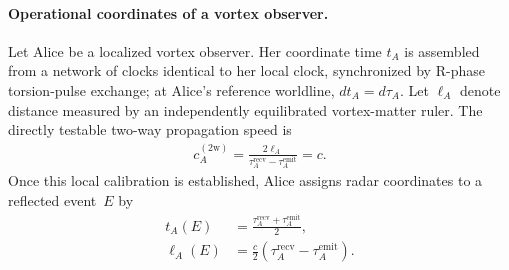 \documentclass[11pt]{article}
\theoremstyle{definition}
\theoremstyle{plain}
\theoremstyle{remark}
\begin{document}
        \paragraph{Operational coordinates of a vortex observer.}
        Let Alice be a localized vortex observer. Her coordinate time \(t_A\) is assembled from a network of clocks identical to her local clock, synchronized by R-phase torsion-pulse exchange; at Alice's reference worldline, \(dt_A=d\tau_A\). Let \(\ell_A\) denote distance measured by an independently equilibrated vortex-matter ruler. The directly testable two-way propagation speed is
        \begin{align}
            c_A^{(2\mathrm w)}
            =
            \frac{2\ell_A}
            {\tau_A^{\mathrm{recv}}-\tau_A^{\mathrm{emit}}}
            =c.
            \label{eq:canonical_time_vortex_radar_speed}
        \end{align}
        Once this local calibration is established, Alice assigns radar coordinates to a reflected event~\(E\) by
        \begin{align}
            t_A(E)
            &=
            \frac{\tau_A^{\mathrm{recv}}+\tau_A^{\mathrm{emit}}}{2},\\
            \ell_A(E)
            &=
            \frac{c}{2}
            \left(
                \tau_A^{\mathrm{recv}}-\tau_A^{\mathrm{emit}}
            \right).
            \label{eq:canonical_time_vortex_radar_coordinates}
        \end{align}
\end{document}
